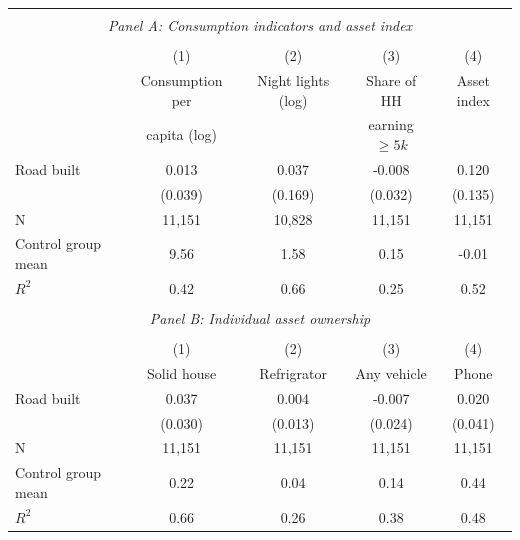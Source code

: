 \begin{tabular}{l*{4}{c}} \hline
\hline \\ \multicolumn{5}{c}{\textit{Panel A: Consumption indicators and asset index}} \\\\ [-1ex] \hline                           &\multicolumn{1}{c}{(1)} & \multicolumn{1}{c}{(2)} &\multicolumn{1}{c}{(3)}          &\multicolumn{1}{c}{(4)}  \\  &\multicolumn{1}{c}{Consumption per} & \multicolumn{1}{c}{Night lights (log)} &\multicolumn{1}{c}{Share of HH} &\multicolumn{1}{c}{Asset index} \\  &\multicolumn{1}{c}{capita (log)} &\multicolumn{1}{c}{} &\multicolumn{1}{c}{earning $\geq5k$} &\multicolumn{1}{c}{} \\ \hline
Road built               &       0.013   &       0.037   &      -0.008   &       0.120   \\
                         &     (0.039)   &     (0.169)   &     (0.032)   &     (0.135)   \\
\hline
N                        &      11,151   &      10,828   &      11,151   &      11,151   \\
Control group mean       &        9.56   &        1.58   &        0.15   &       -0.01   \\
$ R^{2} $                &        0.42   &        0.66   &        0.25   &        0.52   \\
\hline \\ \multicolumn{5}{c}{\textit{Panel B: Individual asset ownership}} \\\\ [-1ex] \hline                                   &\multicolumn{1}{c}{(1)} & \multicolumn{1}{c}{(2)} &\multicolumn{1}{c}{(3)}          &\multicolumn{1}{c}{(4)}  \\          &\multicolumn{1}{c}{Solid house} &\multicolumn{1}{c}{Refrigrator}          &\multicolumn{1}{c}{Any vehicle} &\multicolumn{1}{c}{Phone} \\ \hline
Road built               &       0.037   &       0.004   &      -0.007   &       0.020   \\
                         &     (0.030)   &     (0.013)   &     (0.024)   &     (0.041)   \\
\hline
N                        &      11,151   &      11,151   &      11,151   &      11,151   \\
Control group mean       &        0.22   &        0.04   &        0.14   &        0.44   \\
$ R^{2} $                &        0.66   &        0.26   &        0.38   &        0.48   \\
\hline\hline \end{tabular}
